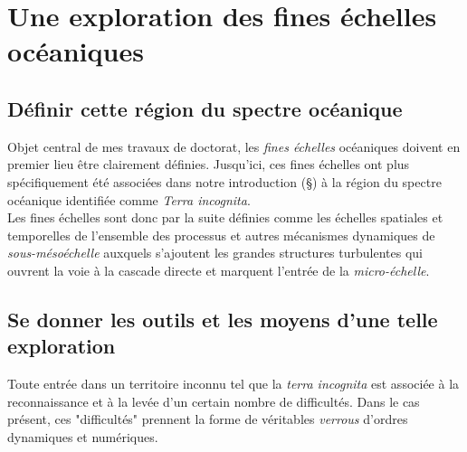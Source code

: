 \color{blue}
\section{Une exploration des fines échelles océaniques}
\subsection{Définir cette région du spectre océanique}
Objet central de mes travaux de doctorat, les \textit{fines échelles} océaniques doivent en premier lieu être clairement définies. Jusqu'ici, ces fines échelles ont plus spécifiquement été associées dans notre introduction (\S {}) à la région du spectre océanique identifiée comme \textit{Terra incognita}.\\
Les fines échelles sont donc par la suite définies comme les échelles spatiales et temporelles de l'ensemble des processus et autres mécanismes dynamiques de \textit{sous-mésoéchelle} \citep{mcwilliams_submesoscale_2016} auxquels s'ajoutent les grandes structures turbulentes qui ouvrent la voie à la cascade directe et marquent l'entrée de la \textit{micro-échelle}.
 \color{black}

\subsection{Se donner les outils et les moyens d'une telle exploration}
\color{blue}
Toute entrée dans un territoire inconnu tel que la \textit{terra incognita} est associée à la reconnaissance et à la levée d'un certain nombre de difficultés. Dans le cas présent, ces "difficultés" prennent la forme de véritables \textit{verrous} d'ordres dynamiques et numériques.
